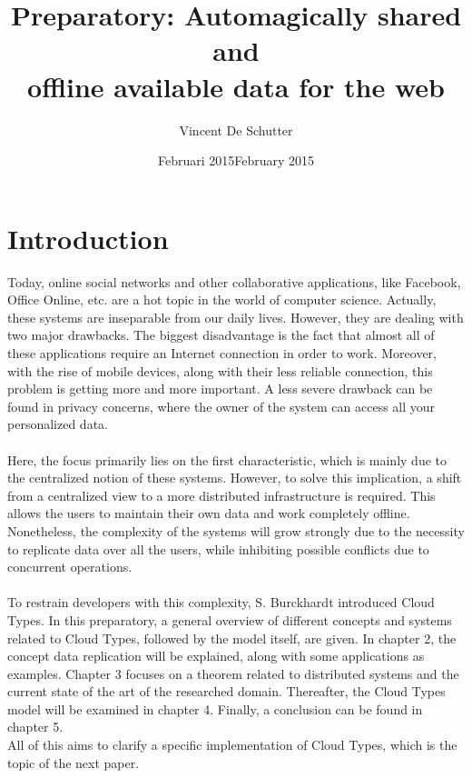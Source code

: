 \documentclass[a4paper,12pt]{report}
\author{Vincent De Schutter}
\title{Preparatory: Automagically shared and \\offline available data for the web}
\date{Februari 2015}
\begin{document}


\date{February 2015}

\maketitlepage


\tableofcontents
\newpage

\chapter{Introduction}\label{cha:Introduction} %

Today, online social networks and other collaborative applications, like Facebook, Office Online, etc. are a hot topic in the world of computer science. Actually, these systems are inseparable from our daily lives. However, they are dealing with two major drawbacks. The biggest disadvantage is the fact that almost all of these applications require an Internet connection in order to work. Moreover, with the rise of mobile devices, along with their less reliable connection, this problem is getting more and more important. A less severe drawback can be found in privacy concerns, where the owner of the system can access all your personalized data. \\
\\
Here, the focus primarily lies on the first characteristic, which is mainly due to the centralized notion of these systems. However, to solve this implication, a shift from a centralized view to a more distributed infrastructure is required. This allows the users to maintain their own data and work completely offline. Nonetheless, the complexity of the systems will grow strongly due to the necessity to replicate data over all the users, while inhibiting possible conflicts due to concurrent operations. \\
\\
To restrain developers with this complexity, S. Burckhardt introduced Cloud Types. In this preparatory, a general overview of different concepts and systems related to Cloud Types, followed by the model itself, are given. In chapter 2, the concept data replication will be explained, along with some applications as examples. Chapter 3 focuses on a theorem related to distributed systems and the current state of the art of the researched domain. Thereafter, the Cloud Types model will be examined in chapter 4. Finally, a conclusion can be found in chapter 5. \\
All of this aims to clarify a specific implementation of Cloud Types, which is the topic of the next paper.
\end{document}
